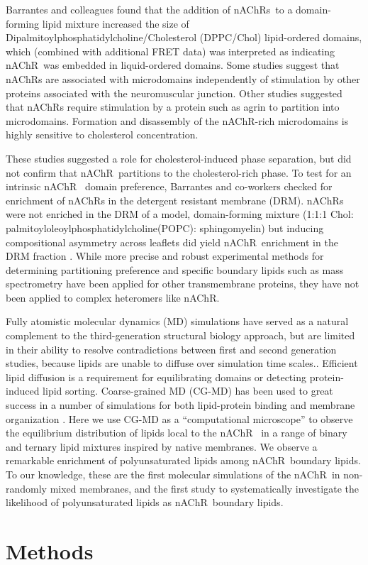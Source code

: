 \documentclass[final,3p,times,twocolumn]{elsarticle}
\newcommand{\nachr}{nAChR}
\begin{document}
Barrantes and colleagues\cite{Wenz2005} found that the addition of \nachr s~to a domain-forming lipid mixture increased the size of Dipalmitoylphosphatidylcholine/Cholesterol (DPPC/Chol) lipid-ordered domains, which (combined with additional FRET data) was interpreted as indicating \nachr~was embedded in liquid-ordered domains.  Some studies \cite{Marchand2002,Stetzkowski-Marden2006,Willmann2006} suggest that \nachr s are associated with microdomains independently of stimulation by other proteins associated with the neuromuscular junction. Other studies\cite{Zhu2006,Campagna2006} suggested that \nachr s require stimulation by a protein such as agrin to partition into microdomains. Formation and disassembly of the \nachr-rich microdomains is highly sensitive to cholesterol concentration.\cite{Barrantes2007,Bruses2001,Marchand2002,Zhu2006,Pun2002}

These studies suggested a role for cholesterol-induced phase separation, but did not confirm that \nachr~partitions to the cholesterol-rich phase.  To test for an intrinsic \nachr~ domain preference, Barrantes and co-workers checked for enrichment of \nachr s in the detergent resistant membrane (DRM).   \nachr s were not enriched in the DRM of a model, domain-forming mixture (1:1:1  Chol: palmitoyloleoylphosphatidylcholine(POPC): sphingomyelin) \cite{Bermdez_Partition_2010} but inducing compositional asymmetry across leaflets did yield \nachr~enrichment in the DRM fraction \cite{Perillo_Transbilayer_2016}.  While more precise and robust experimental methods for determining partitioning preference and specific boundary lipids such as mass spectrometry have been applied for other transmembrane proteins\cite{Gupta2018,Chorev2018}, they have not been applied to complex heteromers like \nachr.  

Fully atomistic molecular dynamics (MD) simulations\cite{Brannigan_Embedded_2008, Cheng2009, Hnin_A_2014, Carswell_Role_2015} have served as a natural complement to the third-generation structural biology approach, but are limited in their ability to resolve contradictions between first and second generation studies, because lipids are unable to diffuse over simulation time scales.\cite{Ingolfsson2014,Bond2006,Parton2013,Goose2013,Scott2008}.   Efficient lipid diffusion is a requirement for equilibrating domains or detecting protein-induced lipid sorting.    Coarse-grained MD (CG-MD) has been used to great success in a number of simulations for both lipid-protein binding and membrane organization \cite{Bond2006,Scott2008,Parton2013,Goose2013,Iyer2018,Sodt2014}. Here we use CG-MD as a ``computational microscope'' to observe the equilibrium distribution of lipids local to the \nachr~ in a range of binary and ternary lipid mixtures inspired by native membranes.   We observe a remarkable enrichment of polyunsaturated lipids among \nachr~boundary lipids. To our knowledge, these are the first molecular simulations of the \nachr~in non-randomly mixed membranes, and the first study to systematically investigate the likelihood of polyunsaturated lipids as \nachr~boundary lipids.  \section{Methods}
\label{S:2}
\end{document}
